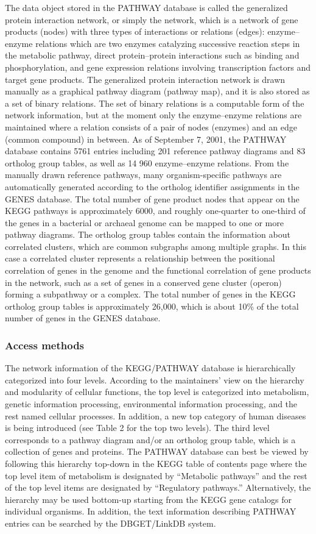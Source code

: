 The data object stored in the PATHWAY database is called the generalized protein
interaction network, or simply the network, which is a network of gene products
(nodes) with three types of interactions or relations (edges): enzyme–enzyme
relations which are two enzymes catalyzing successive reaction steps in the
metabolic pathway, direct protein–protein interactions such as binding and
phosphorylation, and gene expression relations involving transcription factors
and target gene products. The generalized protein interaction network is drawn
manually as a graphical pathway diagram (pathway map), and it is also stored as
a set of binary relations. The set of binary relations is a computable form of
the network information, but at the moment only the enzyme–enzyme relations are
maintained where a relation consists of a pair of nodes (enzymes) and an edge
(common compound) in between. As of September 7, 2001, the PATHWAY database
contains 5761 entries including 201 reference pathway diagrams and 83 ortholog
group tables, as well as 14 960 enzyme–enzyme relations. From the manually drawn
reference pathways, many organism-specific pathways are automatically generated
according to the ortholog identifier assignments in the GENES database. The
total number of gene product nodes that appear on the KEGG pathways is
approximately 6000, and roughly one-quarter to one-third of the genes in a
bacterial or archaeal genome can be mapped to one or more pathway diagrams. The
ortholog group tables contain the information about correlated clusters, which
are common subgraphs among multiple graphs. In this case a correlated cluster
represents a relationship between the positional correlation of genes in the
genome and the functional correlation of gene products in the network, such as a
set of genes in a conserved gene cluster (operon) forming a subpathway or a
complex. The total number of genes in the KEGG ortholog group tables is
approximately 26,000, which is about 10\% of the total number of genes in the
GENES database.

\subsubsection{Access methods}

The network information of the KEGG/PATHWAY database is hierarchically
categorized into four levels. According to the maintainers' view on the
hierarchy and modularity of cellular functions, the top level is categorized
into metabolism, genetic information processing, environmental information
processing, and the rest named cellular processes. In addition, a new top
category of human diseases is being introduced (see Table 2 for the top two
levels). The third level corresponds to a pathway diagram and/or an ortholog
group table, which is a collection of genes and proteins. The PATHWAY database
can best be viewed by following this hierarchy top-down in the KEGG table of
contents page where the top level item of metabolism is designated by
``Metabolic pathways'' and the rest of the top level items are designated by
``Regulatory pathways.'' Alternatively, the hierarchy may be used bottom-up
starting from the KEGG gene catalogs for individual organisms. In addition, the
text information describing PATHWAY entries can be searched by the DBGET/LinkDB
system.
